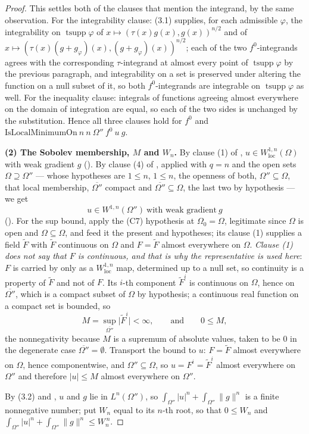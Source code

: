 \begin{proof}
This settles both of the clauses that mention the integrand, by the same
observation.  For the integrability clause: (3.1) supplies, for each admissible
$\varphi$, the integrability on $\operatorname{tsupp}\varphi$ of
$x\mapsto(\tau(x)g(x),g(x))^{n/2}$ and of
$x\mapsto(\tau(x)(g+g_\varphi)(x),(g+g_\varphi)(x))^{n/2}$; each of the two
$f^0$-integrands agrees with the corresponding $\tau$-integrand at almost every
point of $\operatorname{tsupp}\varphi$ by the previous paragraph, and
integrability on a set is preserved under altering the function on a null subset
of it, so both $f^0$-integrands are integrable on $\operatorname{tsupp}\varphi$
as well.  For the inequality clause: integrals of functions agreeing almost
everywhere on the domain of integration are equal, so each of the two sides is
unchanged by the substitution.  Hence all three clauses hold for $f^0$ and
$\mathrm{IsLocalMinimumOn}\ n\ n\ \Omega''\ f^0\ u\ g$.

\textbf{(2) The Sobolev membership, $M$ and $W_n$.}  By clause (1) of
, $u\in W^{1,n}_{\mathrm{loc}}(\Omega)$ with weak
gradient $g$ ().  By clause (4) of
, applied with $q=n$ and the open sets
$\Omega\supseteq\Omega''$ --- whose hypotheses are $1\le n$, $1\le n$, the
openness of both, $\Omega''\subseteq\Omega$, that local membership,
$\overline{\Omega''}$ compact and $\overline{\Omega''}\subseteq\Omega$, the last
two by hypothesis --- we get
\[
u\in W^{1,n}(\Omega'')\ \text{with weak gradient}\ g
\tag{3.2}
\]
().  For the sup bound, apply the (C7) hypothesis at
$\Omega_0=\Omega$, legitimate since $\Omega$ is open and $\Omega\subseteq\Omega$,
and feed it the present  and
 hypotheses; its clause (1) supplies a field
$\widetilde F$ with $\widetilde F$ continuous on $\Omega$ and
$F=\widetilde F$ almost everywhere on $\Omega$.  \emph{Clause \textup{(1)} does
not say that $F$ is continuous, and that is why the representative is used
here}: $F$ is carried by  only as a
$W^{1,n}_{\mathrm{loc}}$ map, determined up to a null set, so continuity is a
property of $\widetilde F$ and not of $F$.  Its $i$-th component
$\widetilde F^i$ is continuous on $\Omega$, hence on $\overline{\Omega''}$,
which is a compact subset of $\Omega$ by hypothesis; a continuous real function
on a compact set is bounded, so
\[
M=\sup_{\overline{\Omega''}}\bigl|\widetilde F^i\bigr|<\infty,
\qquad\text{and}\qquad 0\le M,
\]
the nonnegativity because $M$ is a supremum of absolute values, taken to be $0$
in the degenerate case $\overline{\Omega''}=\emptyset$.  Transport the bound to
$u$: $F=\widetilde F$ almost everywhere on $\Omega$, hence componentwise, and
$\Omega''\subseteq\Omega$, so $u=F^i=\widetilde F^i$ almost everywhere on
$\Omega''$ and therefore $|u|\le M$ almost everywhere on $\Omega''$.

By (3.2) and , $u$ and $g$ lie in $L^n(\Omega'')$, so
$\int_{\Omega''}|u|^n+\int_{\Omega''}\|g\|^n$ is a finite nonnegative number;
put $W_n$ equal to its $n$-th root, so that $0\le W_n$ and
$\int_{\Omega''}|u|^n+\int_{\Omega''}\|g\|^n\le W_n^{\,n}$.
\end{proof}
